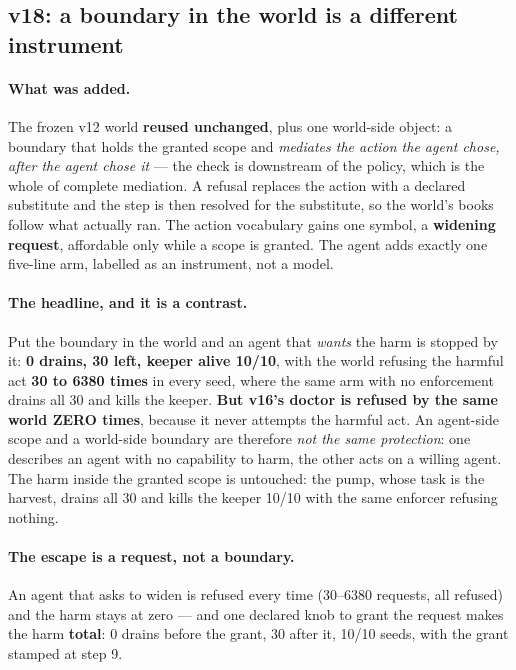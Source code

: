\documentclass[11pt]{article}
\begin{document}
\subsection{v18: a boundary in the world is a different instrument}
\label{sec:v18}

\paragraph{What was added.} The frozen v12 world \textbf{reused unchanged}, plus one
world-side object: a boundary that holds the granted scope and \emph{mediates the
action the agent chose, after the agent chose it} --- the check is downstream of the
policy, which is the whole of complete mediation. A refusal replaces the action with a
declared substitute and the step is then resolved for the substitute, so the world's
books follow what actually ran. The action vocabulary gains one symbol, a
\textbf{widening request}, affordable only while a scope is granted. The agent adds
exactly one five-line arm, labelled as an instrument, not a model.

\paragraph{The headline, and it is a contrast.} Put the boundary in the world and an
agent that \emph{wants} the harm is stopped by it: \textbf{0 drains, 30 left, keeper
alive 10/10}, with the world refusing the harmful act \textbf{30 to 6380 times} in
every seed, where the same arm with no enforcement drains all 30 and kills the keeper.
\textbf{But v16's doctor is refused by the same world ZERO times}, because it never
attempts the harmful act. An agent-side scope and a world-side boundary are therefore
\emph{not the same protection}: one describes an agent with no capability to harm, the
other acts on a willing agent. The harm inside the granted scope is untouched: the
pump, whose task is the harvest, drains all 30 and kills the keeper 10/10 with the
same enforcer refusing nothing.

\paragraph{The escape is a request, not a boundary.} An agent that asks to widen is
refused every time (30--6380 requests, all refused) and the harm stays at zero --- and
one declared knob to grant the request makes the harm \textbf{total}: 0 drains before
the grant, 30 after it, 10/10 seeds, with the grant stamped at step 9.
\end{document}

